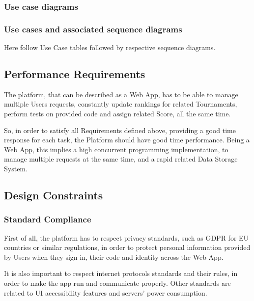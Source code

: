 \newpage

\subsubsection{Use case diagrams}

\newpage

\subsubsection{Use cases and associated sequence diagrams}
Here follow Use Case tables followed by respective sequence diagrams.


\subsection{Performance Requirements}
The platform, that can be described as a Web App, has to be able to manage multiple Users requests, constantly update rankings for related Tournaments, perform tests on provided code and assign related Score, all the same time. 

So, in order to satisfy all Requirements defined above, providing a good time response for each task, the Platform should have good time performance. Being a Web App, this implies a high concurrent programming implementation, to 
manage multiple requests at the same time, and a rapid related Data Storage System. 

\subsection{Design Constraints}

\subsubsection{Standard Compliance}
First of all, the platform has to respect privacy standards, such as GDPR for EU countries or similar regulations, in order to protect personal information provided by Users when they sign in, their code and identity across the Web App.

It is also important to respect internet protocols standards and their rules, in order to make the app run and communicate properly. Other standards are related to UI accessibility features and servers' power consumption. 

